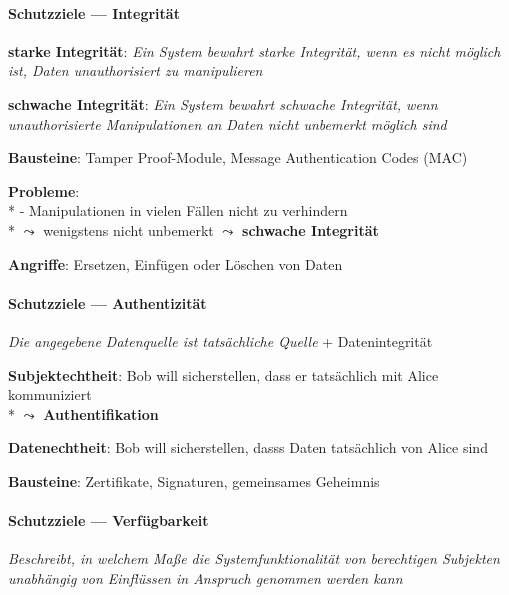 \paragraph{Schutzziele --- Integrität}
\begin{items}
  \item \textbf{starke Integrität}: \emph{Ein System bewahrt starke Integrität, wenn es nicht möglich ist, Daten unauthorisiert zu manipulieren}
  \item \textbf{schwache Integrität}: \emph{Ein System bewahrt schwache Integrität, wenn unauthorisierte Manipulationen an Daten nicht unbemerkt möglich sind}
  \item \textbf{Bausteine}: Tamper Proof-Module, Message Authentication Codes (MAC)
  \item \textbf{Probleme}: \\*
    - Manipulationen in vielen Fällen nicht zu verhindern \\*
    \( \leadsto \) wenigstens nicht unbemerkt \( \leadsto \) \textbf{schwache Integrität}
  \item \textbf{Angriffe}: Ersetzen, Einfügen oder Löschen von Daten
\end{items}

\paragraph{Schutzziele --- Authentizität}
\begin{items}
  \item \emph{Die angegebene Datenquelle ist tatsächliche Quelle} + Datenintegrität
  \item \textbf{Subjektechtheit}: Bob will sicherstellen, dass er tatsächlich mit Alice kommuniziert \\* \( \leadsto \) \textbf{Authentifikation}
  \item \textbf{Datenechtheit}: Bob will sicherstellen, dasss Daten tatsächlich von Alice sind
  \item \textbf{Bausteine}: Zertifikate, Signaturen, gemeinsames Geheimnis
\end{items}

\paragraph{Schutzziele --- Verfügbarkeit}
\begin{items}
  \item \emph{Beschreibt, in welchem Maße die Systemfunktionalität von berechtigen Subjekten unabhängig von Einflüssen in Anspruch genommen werden kann}
\end{items}


